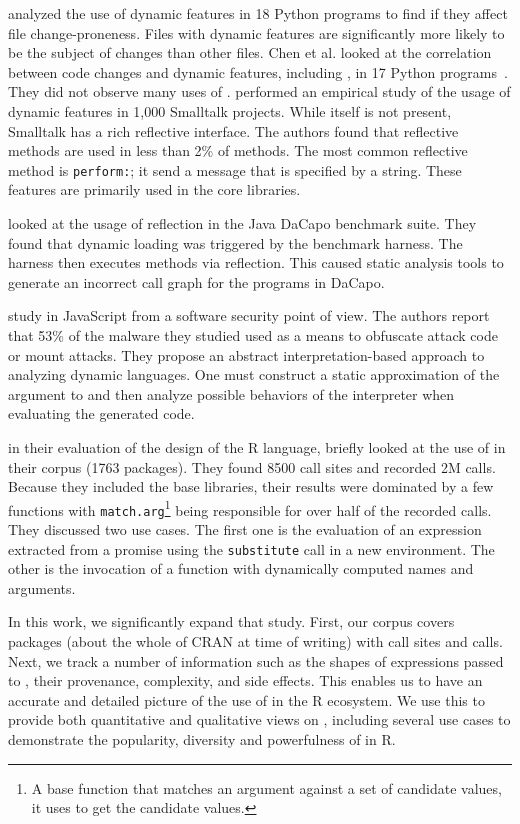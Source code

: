 \documentclass[acmsmall, screen]{acmart}
\renewcommand{\k}[1]{\lstinline |#1|\xspace}
\begin{document}
\citet{wang} analyzed the use of dynamic features in 18 Python programs to find if
they affect file change-proneness. Files with dynamic features are significantly
more likely to be the subject of changes than other files. Chen et al. looked
at the correlation between code changes and dynamic features, including \eval,
in 17 Python programs~\cite{chen}. They did not observe many uses of \eval.
\citet{oscar} performed an empirical study of the usage of dynamic features in
1,000 Smalltalk projects. While \eval itself is not present, Smalltalk has a
rich reflective interface. The authors found that reflective methods are used in less
than 2\% of methods. The most common reflective method is \k{perform:}; it send
a message that is specified by a string. These features are primarily used in the
core libraries.

\citet{bodden} looked at the usage of reflection in the Java DaCapo benchmark suite.
They found that dynamic loading was triggered by the benchmark harness. The
harness then executes methods via reflection. This caused static analysis tools
to generate an incorrect call graph for the programs in DaCapo.

\citet{Arceri21} study \eval in JavaScript from a software security point of
view. The authors report that 53\% of the malware they studied used \eval as a
means to obfuscate attack code or mount attacks. They propose an abstract
interpretation-based approach to analyzing dynamic languages. One must construct
a static approximation of the argument to \eval and then analyze possible
behaviors of the interpreter when evaluating the generated code.

\citet{ecoop12} in their evaluation of the design of the R language, briefly
looked at the use of \eval in their corpus (1763 packages). They found 8500
\eval call sites and recorded 2M \eval calls. Because they included the base
libraries, their results were dominated by a few functions with
\k{match.arg}\footnote{A base function that matches an argument against a set of
candidate values, it uses \eval to get the candidate values.} being responsible
for over half of the recorded \eval calls. They discussed two use cases. The
first one is the evaluation of an expression extracted from a promise using the
\k{substitute} call in a new environment. The other is the invocation of a
function with dynamically computed names and arguments.

In this work, we significantly expand that study. First, our corpus covers
\CranPackages packages (about the whole of CRAN at time of writing) with
\PkgHitEvalCallSites \eval call sites and \packageAllcallsRnd \eval calls.
Next, we track a number of information such as the shapes of expressions
passed to \eval, their provenance, complexity, and side effects. This enables
us to have an accurate and detailed picture of the use of \eval in the R
ecosystem. We use this to provide both quantitative and qualitative views on
\eval, including several use cases to demonstrate the popularity, diversity and
powerfulness of \eval in R.
\end{document}
